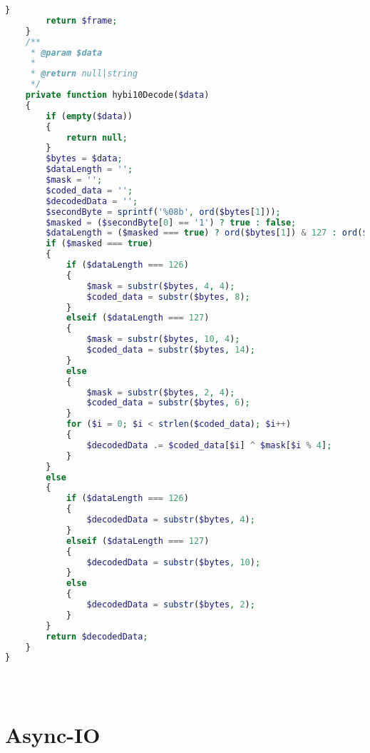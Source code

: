 \begin{lstlisting}[language=PHP]
        }
        return $frame;
    }
    /**
     * @param $data
     *
     * @return null|string
     */
    private function hybi10Decode($data)
    {
        if (empty($data))
        {
            return null;
        }
        $bytes = $data;
        $dataLength = '';
        $mask = '';
        $coded_data = '';
        $decodedData = '';
        $secondByte = sprintf('%08b', ord($bytes[1]));
        $masked = ($secondByte[0] == '1') ? true : false;
        $dataLength = ($masked === true) ? ord($bytes[1]) & 127 : ord($bytes[1]);
        if ($masked === true)
        {
            if ($dataLength === 126)
            {
                $mask = substr($bytes, 4, 4);
                $coded_data = substr($bytes, 8);
            }
            elseif ($dataLength === 127)
            {
                $mask = substr($bytes, 10, 4);
                $coded_data = substr($bytes, 14);
            }
            else
            {
                $mask = substr($bytes, 2, 4);
                $coded_data = substr($bytes, 6);
            }
            for ($i = 0; $i < strlen($coded_data); $i++)
            {
                $decodedData .= $coded_data[$i] ^ $mask[$i % 4];
            }
        }
        else
        {
            if ($dataLength === 126)
            {
                $decodedData = substr($bytes, 4);
            }
            elseif ($dataLength === 127)
            {
                $decodedData = substr($bytes, 10);
            }
            else
            {
                $decodedData = substr($bytes, 2);
            }
        }
        return $decodedData;
    }
}
\end{lstlisting}




\begin{lstlisting}[language=PHP]

\end{lstlisting}




\begin{lstlisting}[language=PHP]

\end{lstlisting}




\begin{lstlisting}[language=PHP]

\end{lstlisting}


\chapter{Async-IO}


